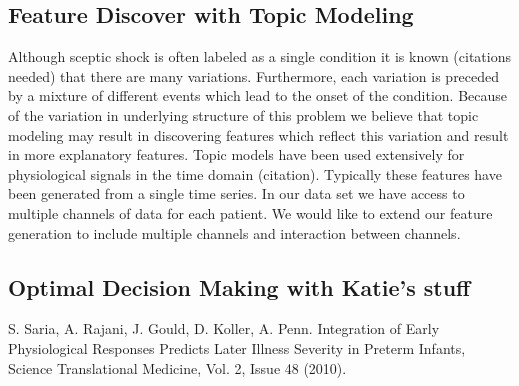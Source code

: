 \documentclass[dvips,12pt]{article}
\begin{document}
\subsection{Feature Discover with Topic Modeling}

Although sceptic shock is often labeled as a single condition it is known (citations needed) that there are many variations. 
Furthermore, each variation is preceded by a mixture of different events which lead to the onset of the condition. Because of the variation in underlying structure
of this problem we believe that topic modeling may result in discovering features which reflect this variation and result in more explanatory features. Topic models have been used extensively for physiological signals in the time domain (citation). Typically these features have been generated from a single time series. In our data set we have access to multiple channels of data for each patient. We would like to extend our feature generation to include multiple channels and interaction between channels. 

\subsection{Optimal Decision Making with Katie's stuff}
\begin{thebibliography}{99}
 S. Saria, 
A. Rajani, 
J. Gould, 
D. Koller, 
A. Penn. 
{Integration of Early Physiological Responses Predicts Later Illness Severity in Preterm Infants},
Science Translational Medicine, Vol. 2, Issue 48 (2010).

\end{thebibliography}
\end{document}
